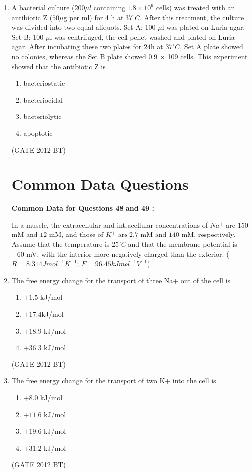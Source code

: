 \documentclass[journal,12pt,onecolumn]{IEEEtran}
\theoremstyle{remark}
\begin{document}
\begin{enumerate}
\item A bacterial culture ($200 \mu l$ containing $1.8 × 10^9$ cells) was treated with an antibiotic Z ($50 \mu $g per ml) for 4 h at $37^\circ C$. After this treatment, the culture was divided into two equal aliquots.
Set A: 100 $\mu$l was plated on Luria agar.
Set B: 100 $\mu$l was centrifuged, the cell pellet washed and plated on Luria agar.
After incubating these two plates for $24 $h at  $37^\circ C$, Set A plate showed no colonies, whereas the Set B plate showed 0.9 × 109 cells. This experiment showed that the antibiotic Z is
\begin{multicols}{2}
\begin{enumerate}
\item	bacteriostatic
\item  bacteriocidal
\item  bacteriolytic	
\item apoptotic
\end{enumerate}
\end{multicols} \hfill(GATE 2012 BT)


\section{Common Data Questions}
\textbf{Common Data for Questions 48 and 49 :}

In a muscle, the extracellular and intracellular concentrations of $Na^+$ are 150 mM and $12$ mM, and those of $K^+$ are $2.7$ mM and $140$ mM, respectively. Assume that the temperature is $25^\circ C$ and that the membrane potential is $-60$ mV, with the interior more negatively charged than the exterior. ($R = 8.314 J mol^{-1} K^{-1}$; $F = 96.45 kJ mol^{-1} V^{-1}$)
\item 	The free energy change for the transport of three Na+ out of the cell is
\begin{multicols}{4}
\begin{enumerate}
\item $+1.5$ kJ/mol	
\item $+17.4 $kJ/mol	
\item  $+18.9$ kJ/mol	
\item  $+36.3$ kJ/mol
\end{enumerate}
\end{multicols} \hfill(GATE 2012 BT)

\item The free energy change for the transport of two K+ into the cell is
\begin{multicols}{4}
\begin{enumerate}
\item $+8.0$ kJ/mol	
\item $+11.6$ kJ/mol	
\item $ +19.6$ kJ/mol	
\item  $+31.2$ kJ/mol
\end{enumerate}
\end{multicols} \hfill(GATE 2012 BT)


\end{enumerate}
\end{document}
